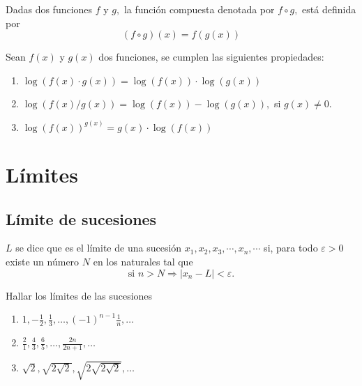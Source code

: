 \begin{definition*}
	Dadas dos funciones \(f\) y \(g,\) la funci\'on compuesta denotada por \(f\circ g,\) est\'a definida por
	\[
	(f\circ g)(x)=f(g(x))
	\]
	
\end{definition*}


\begin{property}
	Sean \(f(x)\) y \(g(x)\) dos funciones, se cumplen las siguientes propiedades:
	\begin{enumerate}
		\item \(\log(f(x)\cdot g(x))=\log(f(x))\cdot\log(g(x))\)
		\item \(\log(f(x)/g(x))=\log(f(x))-\log(g(x)),\) si \(g(x)\neq 0.\)
		\item \(\log(f(x))^{g(x)}=g(x)\cdot\log(f(x))\)
	\end{enumerate}
\end{property}




\chapter{L\'imites}


\section*{L\'imite de sucesiones}


\begin{definition}
	\(L\) se dice que es el l\'imite de una sucesi\'on \(x_1,x_2,x_3,\cdots,x_n,\cdots\) si, para todo \(\varepsilon>0\) existe un n\'umero \(N\) en los naturales tal que
	\[
	\text{si }n>N\Rightarrow\left|x_n-L\right|<\varepsilon.
	\]
	
\end{definition}


\begin{exercise}
	Hallar los l\'imites de las sucesiones
	\begin{enumerate}
		\item \(1,-\frac{1}{2},\frac{1}{3},\dots,(-1)^{n-1}\frac{1}{n},\dots\)
		\item \(\frac{2}{1},\frac{4}{3},\frac{6}{5},\dots,\frac{2n}{2n+1},\dots\)
		\item \(\sqrt{2},\sqrt{2\sqrt{2}},\sqrt{2\sqrt{2\sqrt{2}}},\dots\)
	\end{enumerate}
\end{exercise}

